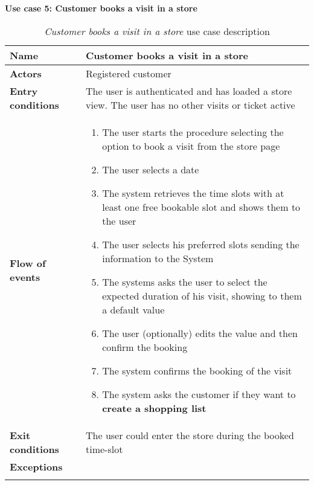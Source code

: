     \clearpage
    \textbf{Use case 5: Customer books a visit in a store}
    \smallskip
    \begin{longtable}{p{0.25\linewidth}p{0.75\linewidth}}
    \toprule
    \textbf{Name} & \textbf{Customer books a visit in a store} \\
    \midrule
    \textbf{Actors} & Registered customer \\
    \midrule
    \textbf{Entry conditions} & The user is authenticated and has loaded a store view. The user has no other visits or ticket active \\
    \midrule
    \textbf{Flow of events} & 
    \begin{enumerate}
        \item The user starts the procedure selecting the option to book a visit from the store page
        \item The user selects a date
        \item The system retrieves the time slots with at least one free bookable slot and shows them to the user
        \item The user selects his preferred slots sending the information to the System
        \item The systems asks the user to select the expected duration of his visit, showing to them a default value
        \item The user (optionally) edits the value and then confirm the booking
        \item The system confirms the booking of the visit
        \item The system asks the customer if they want to \textbf{create a shopping list}
    \end{enumerate} \\
    \midrule
    \textbf{Exit conditions} & The user could enter the store during the booked time-slot \\
    \midrule
    \textbf{Exceptions} & \\
    \bottomrule
    \caption{\emph{Customer books a visit in a store} use case description}
    \end{longtable}

